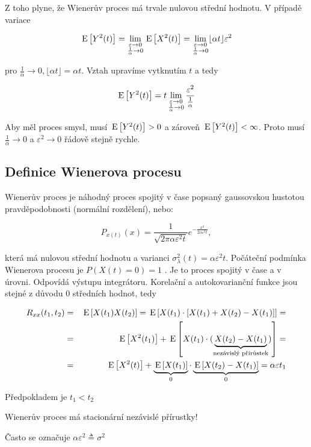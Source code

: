 Z toho plyne, že Wienerův proces má trvale nulovou střední hodnotu. V případě variace

\[ \,\mathrm{E}\left[Y^2(t)\right] = \lim_{\substack{\varepsilon\to 0\\ \frac{1}{\alpha}\to 0}} \,\mathrm{E}\left[X^2(t)\right]=\lim_{\substack{\varepsilon\to 0\\ \frac{1}{\alpha}\to 0}} \lfloor\alpha t\rfloor \varepsilon^2 \]

pro $\frac{1}{\alpha}\to 0, \lfloor\alpha t\rfloor=\alpha t$. Vztah upravíme vytknutím $t$ a tedy

\[ \,\mathrm{E}\left[Y^2(t)\right] = t \lim_{\substack{\varepsilon\to 0\\ \frac{1}{\alpha}\to 0}} \frac{\varepsilon^2}{\frac{1}{\alpha}} \]

Aby měl proces smysl, musí $\,\mathrm{E}\left[Y^2(t)\right]>0$ a zároveň $\,\mathrm{E}\left[Y^2(t)\right]<\infty$. Proto musí $\frac{1}{\alpha}\to 0$ a $\varepsilon^2\to 0$ řádově stejně rychle.

\subsection{Definice Wienerova procesu}
Wienerův proces je náhodný proces spojitý v čase popsaný gaussovskou hustotou pravděpodobnosti (normální rozdělení), nebo:

\[ P_{x(t)}(x)=\frac{1}{\sqrt{2\pi\alpha\varepsilon^2 t}}e^{-\frac{x^2}{2\alpha\varepsilon^2 t}}, \]

která má nulovou střední hodnotu a varianci $\sigma^2_\lambda(t) = \alpha\varepsilon^2 t$. Počáteční podmínka Wienerova procesu je $P(X(t)=0)=1$ . Je to proces spojitý v čase a v úrovni. Odpovídá výstupu integrátoru. Korelační a autokovarianční funkce jsou stejné z důvodu 0 středních hodnot, tedy

\begin{eqnarray*}
R_{xx}(t_1,t_2) &=&\,\mathrm{E}\left[X(t_1)X(t_2)\right] = \,\mathrm{E}\left[X(t_1)\cdot[X(t_1)+X(t_2)-X(t_1)]\right] = \\
& = & \,\mathrm{E}\left[X^2(t_1)\right] + \,\mathrm{E}\left[X(t_1)\cdot(\underbrace{X(t_2)-X(t_1)}_{\text{nezávislý přírůstek}})\right]= \\
& = & \,\mathrm{E}\left[X^2(t)\right]+\underbrace{\,\mathrm{E}\left[X(t_1)\right]}_0\cdot \underbrace{\,\mathrm{E}\left[X(t_2)-X(t_1)\right]}_0 = \alpha\varepsilon t_1
\end{eqnarray*}

Předpokladem je $t_1<t_2$

Wienerův proces má stacionární nezávislé přírustky!

Často se označuje $\alpha\varepsilon^2 \triangleq \sigma^2$